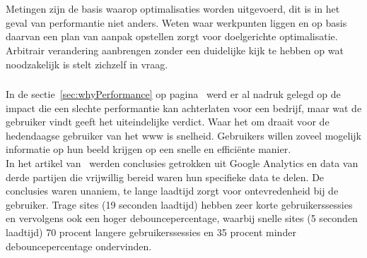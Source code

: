 

\chapter{}
\label{ch:theoretischePerformantie}

\section{}
\label{sec:importantMetrics}

Metingen zijn de basis waarop optimalisaties worden uitgevoerd, dit is in het geval van performantie niet anders. Weten waar werkpunten liggen en op basis daarvan een plan van aanpak opstellen zorgt voor doelgerichte optimalisatie. Arbitrair verandering aanbrengen zonder een duidelijke kijk te hebben op wat noodzakelijk is stelt zichzelf in vraag.

\subsection{}
\label{sec:biggestFactor}

In de sectie~\ref{sec:whyPerformance} op pagina~\pageref{sec:whyPerformance} werd er al nadruk gelegd op de impact die een slechte performantie kan achterlaten voor een bedrijf, maar wat de gebruiker vindt geeft het uiteindelijke verdict. Waar het om draait voor de hedendaagse gebruiker van het \gls{www} is snelheid. Gebruikers willen zoveel mogelijk informatie op hun beeld krijgen op een snelle en efficiënte manier. \\
In het artikel van~\textcite{Everts2016} werden conclusies getrokken uit Google Analytics en data van derde partijen die vrijwillig bereid waren hun specifieke data te delen. De conclusies waren unaniem, te lange laadtijd zorgt voor ontevredenheid bij de gebruiker. Trage sites (19 seconden laadtijd) hebben zeer korte gebruikerssessies en vervolgens ook een hoger debouncepercentage, waarbij snelle sites (5 seconden laadtijd) 70 procent langere gebruikerssessies en 35 procent minder debouncepercentage ondervinden.

\subsection{}
\label{sec:metrics}

